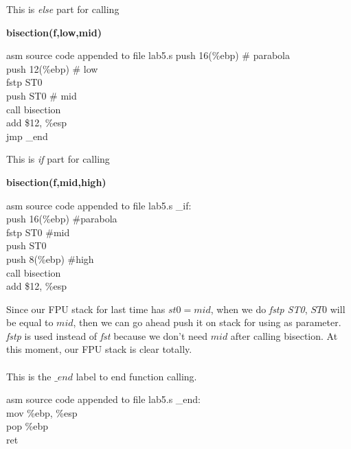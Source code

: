 \documentclass{article}
\begin{document}
\pagebreak
\begin{multicols}{2}
This is \textit{else} part for calling
\begin{center}
\textbf{bisection(f,low,mid)} 
\end{center}
\begin{GFT}{asm source code appended to file lab5.s}
\+push 16(\%ebp)		\# parabola\\
\+push 12(\%ebp)		\# low		\\
\+fstp ST0		\\
\+push ST0		\# mid\\
\+call bisection\\
\+add \$12, \%esp\\
\+jmp \_end\\
\end{GFT}
\columnbreak
This is \textit{if} part for calling 
\begin{center}
\textbf{bisection(f,mid,high)}
\end{center}
\begin{GFT}{asm source code appended to file lab5.s}
\+\_if:\\
\+push 16(\%ebp)		\#parabola\\
\+fstp ST0		\#mid\\
\+push ST0\\
\+push 8(\%ebp)		\#high\\
\+call bisection\\
\+add \$12, \%esp\\
\end{GFT}
\end{multicols}
Since our FPU stack for last time has $st0 = mid$, when we do \textit{fstp ST0}, $ST0$ will be equal to $mid$, then we can go ahead push it on stack for using as parameter. \textit{fstp} is used instead of \textit{fst} because we don't need $mid$ after calling bisection. At this moment, our FPU stack is clear totally. \\ \\ This is the $\_end$ label to end function calling.
\begin{GFT}{asm source code appended to file lab5.s}
\+\_end:\\
\+mov \%ebp, \%esp\\
\+pop \%ebp\\
\+ret\\
\end{GFT}
\clearpage
\end{document}
